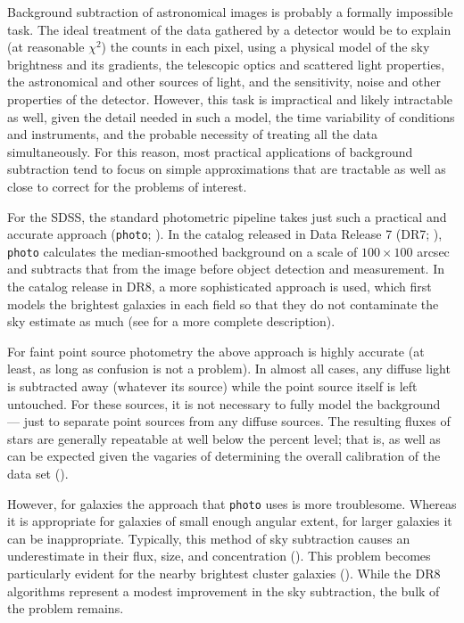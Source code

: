 \documentclass[10pt,preprint]{aastex}
\begin{document}
Background subtraction of astronomical images is probably a formally
impossible task.  The ideal treatment of the data gathered by a
detector would be to explain (at reasonable $\chi^2$) the counts in
each pixel, using a physical model of the sky brightness and its
gradients, the telescopic optics and scattered light properties, the
astronomical and other sources of light, and the sensitivity, noise
and other properties of the detector.
However, this task is impractical and likely intractable as well,
given the detail needed in such a model, the time variability of
conditions and instruments, and the probable necessity of treating all
the data simultaneously. For this reason, most practical applications
of background subtraction tend to focus on simple approximations that
are tractable as well as close to correct for the problems of
interest.

For the SDSS, the standard photometric pipeline takes just such a
practical and accurate approach ({\tt photo}; \citealt{lupton01a}). In
the catalog released in Data Release 7 (DR7; \citealt{abazajian09a}),
{\tt photo} calculates the median-smoothed background on a scale of
$100\times100$ arcsec and subtracts that from the image before object
detection and measurement.  In the catalog release in DR8, a more
sophisticated approach is used, which first models the brightest
galaxies in each field so that they do not contaminate the sky
estimate as much (see \citealt{aihara11a} for a more complete
description).

For faint point source photometry the above approach is highly
accurate (at least, as long as confusion is not a problem). In almost
all cases, any diffuse light is subtracted away (whatever its source)
while the point source itself is left untouched. For these sources, it
is not necessary to fully model the background --- just to separate
point sources from any diffuse sources. The resulting fluxes of stars
are generally repeatable at well below the percent level; that is, as
well as can be expected given the vagaries of determining the overall
calibration of the data set (\citealt{padmanabhan07a}).

However, for galaxies the approach that {\tt photo} uses is more
troublesome.  Whereas it is appropriate for galaxies of small enough
angular extent, for larger galaxies it can be inappropriate.
Typically, this method of sky subtraction causes an underestimate in
their flux, size, and concentration (\citealt{west05a, blanton05b,
hyde09a, west10a}). This problem becomes particularly evident for the
nearby brightest cluster galaxies (\citealt{bernardi07a,
lauer07a}). While the DR8 algorithms represent a modest improvement in
the sky subtraction, the bulk of the problem remains.
\end{document}
